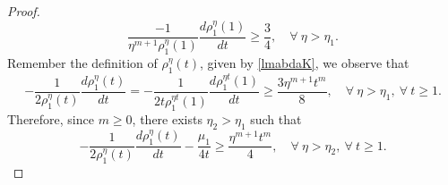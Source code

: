 \documentclass[12pt,leqno]{amsart}
\numberwithin{equation}{section}
\theoremstyle{remark}
\def\d{\displaystyle}
\begin{document}
\begin{proof}
\begin{equation}
\d \frac{-1}{\eta^{m+1}\rho^{\eta}_1(1)}\frac{d\rho^{\eta}_1(1)}{dt} \ge \frac34, \quad \forall \ \eta > \eta_1.
\end{equation}
Remember the definition of $\rho^{\eta}_1(t)$, given by \eqref{lmabdaK}, we observe that
\begin{equation}\label{lambda'lambda4}
\d -\frac{1}{2\rho^{\eta}_1(t)}\frac{d\rho^{\eta}_1(t)}{dt} = -\frac{1}{2 t \rho^{\eta t}_1(1)}\frac{d\rho^{\eta t}_1(1)}{dt} 
 \ge \frac{3\eta^{m+1} t^{m}}8, \quad \forall \ \eta > \eta_1, \ \forall \ t \ge 1.
\end{equation}
Therefore, since $m \ge 0$, there exists $\eta_2>\eta_1$ such that
\begin{equation}\label{lambda'lambda5}
-\frac{1}{2\rho^{\eta}_1(t)}\frac{d\rho^{\eta}_1(t)}{dt}-\frac{\mu_1}{4t}
 \ge  \frac{\eta^{m+1} t^{m}}4, \quad \forall \ \eta > \eta_2, \ \forall \ t \ge 1.
\end{equation}


\end{proof}
\end{document}
